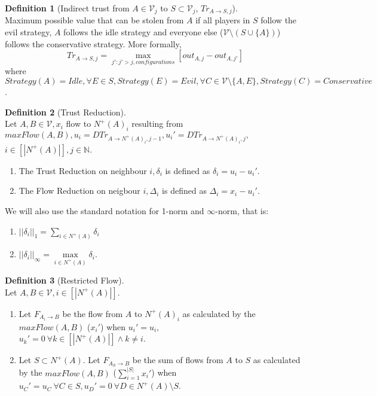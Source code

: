 \documentclass[11pt]{article}
\theoremstyle{definition}
\newtheorem{definition}{Definition}[section]
\theoremstyle{corollary}
\theoremstyle{lemma}
\begin{document}
     \begin{definition}[Indirect trust from $A \in \mathcal{V}_j$ to $S \subset \mathcal{V}_j$, $Tr_{A \rightarrow S, j}$]
        \ \\Maximum possible value that can be stolen from $A$ if all players in $S$ follow the evil strategy, $A$ follows
        the idle strategy and everyone else ($\mathcal{V} \setminus (S \cup \{A\})$) follows the conservative strategy. More
        formally, $$Tr_{A \rightarrow S, j} = \max\limits_{j' : j' > j, configurations}{[out_{A,j} - out_{A,j'}]}$$ where
        $Strategy(A) = Idle, \forall E \in S, Strategy(E) = Evil,
        \forall C \in \mathcal{V} \setminus \{A,E\}, Strategy(C) = Conservative$.
     \end{definition}
     \begin{definition}[Trust Reduction] \ \\
        Let $A, B \in \mathcal{V}, x_i$ flow to $N^{+}(A)_i$ resulting from $maxFlow(A,B), u_i =
        DTr_{A \rightarrow N^{+}(A)_i,j-1}, u_i' = DTr_{A \rightarrow N^{+}(A)_i,j},$ \\ $i \in [|N^{+}(A)|],
        j \in \mathbb{N}$.
        \begin{enumerate}
           \item The Trust Reduction on neighbour $i, \delta_i$ is defined as $\delta_i = u_i - u_i'$.
           \item The Flow Reduction on neigbour $i, \Delta_i$ is defined as $\Delta_i = x_i - u_i'$.
        \end{enumerate}
        We will also use the standard notation for 1-norm and $\infty$-norm, that is:
        \begin{enumerate}
           \item $||\delta_i||_1 = \sum\limits_{i \in N^{+}(A)}\delta_i$
           \item $||\delta_i||_\infty = \max\limits_{i \in N^{+}(A)}\delta_i$.
        \end{enumerate}
     \end{definition}
     \begin{definition}[Restricted Flow] \ \\
        Let $A, B \in \mathcal{V}, i \in [|N^{+}(A)|]$.
        \begin{enumerate}
           \item Let $F_{A_i \rightarrow B}$ be the flow from $A$ to $N^{+}(A)_i$ as calculated by the $maxFlow(A,B)$
              ($x_i'$) when $u_i' = u_i,$ \\ $u_k' = 0 \:\forall k \in [|N^{+}(A)|] \wedge k \neq i$.
           \item Let $S \subset N^{+}(A)$. Let $F_{A_S \rightarrow B}$ be the sum of flows from $A$ to $S$ as
              calculated by the $maxFlow(A,B)$ ($\sum\limits_{i=1}^{|S|}x_i'$) when $u_C' = u_C \: \forall C \in S,
              u_D' = 0 \: \forall D \in N^{+}(A) \setminus S$.
        \end{enumerate}
     \end{definition}
\end{document}
